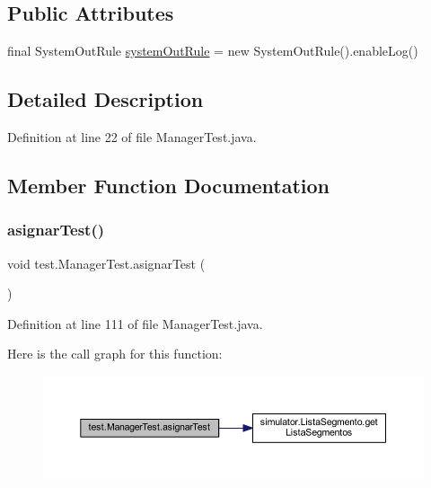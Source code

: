 \subsection*{Public Attributes}
\begin{DoxyCompactItemize}
\item 
final System\+Out\+Rule \mbox{\hyperlink{classtest_1_1_manager_test_a145ff3d1782752daa94a07ab9c2cb312}{system\+Out\+Rule}} = new System\+Out\+Rule().enable\+Log()
\end{DoxyCompactItemize}


\subsection{Detailed Description}


Definition at line 22 of file Manager\+Test.\+java.



\subsection{Member Function Documentation}
\mbox{\label{classtest_1_1_manager_test_ab470b5d3e7f291fa187e1c737d782b34}} 
\subsubsection{\texorpdfstring{asignar\+Test()}{asignarTest()}}
{\footnotesize\ttfamily void test.\+Manager\+Test.\+asignar\+Test (\begin{DoxyParamCaption}{ }\end{DoxyParamCaption})}



Definition at line 111 of file Manager\+Test.\+java.

Here is the call graph for this function\+:\nopagebreak
\begin{figure}[H]
\begin{center}
\leavevmode
\includegraphics[width=350pt]{classtest_1_1_manager_test_ab470b5d3e7f291fa187e1c737d782b34_cgraph}
\end{center}
\end{figure}
\mbox{\label{classtest_1_1_manager_test_ad710f9a15cc2d2f6aaeb827b25cbd1d2}} 
